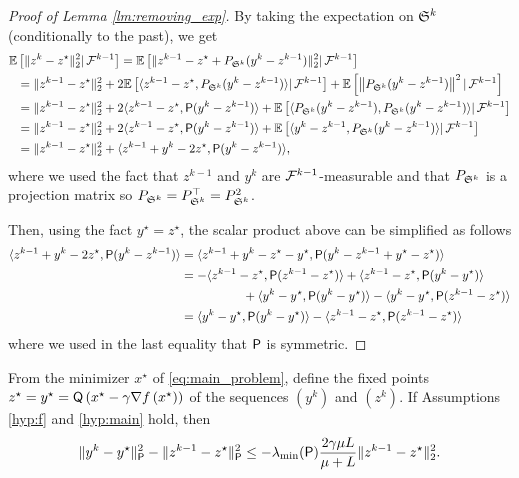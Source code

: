 \begin{proof}[Proof of Lemma \ref{lm:removing_exp}]
By taking the expectation on $\mathfrak{S}^k$ (conditionally to the past), we get 
\begin{align*}
\mathbb{E}&\left[\|z^{k} - z^\star\|_2^2|\,\mathcal{F}^{k-1}\right]  = \mathbb{E} \left[\|z^{k-1} - z^\star + P_{\mathfrak{S}^k}(y^k-z^{k-1}) \|_2^2 |\,\mathcal{F}^{k-1}\right]\\
&= \|z^{k-1}-z^\star\|_2^2 + 2 \mathbb{E} \left[  \langle z^{k-1}-z^\star, P_{\mathfrak{S}^k}(y^k - z^{k-1} ) \rangle |\,\mathcal{F}^{k-1}\right]+ \mathbb{E} \left[ \left\| P_{\mathfrak{S}^k}(y^k-z^{k-1}) \right\|^2 |\,\mathcal{F}^{k-1}\right] \\
&=\|z^{k-1}-z^\star\|_2^2 + 2\langle z^{k-1}-z^\star, {\mathsf{P}}(y^k - z^{k-1} ) \rangle + \mathbb{E} \left[\langle  P_{\mathfrak{S}^k}(y^k-z^{k-1}), P_{\mathfrak{S}^k} (y^k-z^{k-1})\rangle |\,\mathcal{F}^{k-1}\right]\\
&=\|z^{k-1}-z^\star\|_2^2 + 2\langle z^{k-1}-z^\star, {\mathsf{P}}(y^k - z^{k-1} ) \rangle + \mathbb{E} \left[ \langle y^k-z^{k-1}, P_{\mathfrak{S}^k} (y^k-z^{k-1})\rangle |\,\mathcal{F}^{k-1}\right] \\
&= \|z^{k-1}-z^\star\|_2^2 + \langle z^{k-1} + y^k - 2 z^\star , {\mathsf{P}}(y^k - z^{k-1} ) \rangle,
\end{align*}
where we used the fact that $z^{k-1}$ and $y^k$ are $\mathcal{F}^{k-1}$-measurable and that $P_{\mathfrak{S}^k}$ is a projection matrix so $P_{\mathfrak{S}^k} = P_{\mathfrak{S}^k}^\top = P_{\mathfrak{S}^k}^2 $.

Then, using the fact $y^\star = z^\star$, the scalar product above can be simplified as follows
\begin{align*}
\nonumber\langle z^{k-1} + y^k - 2z^\star , {\mathsf{P}}(y^k - z^{k-1}) \rangle &= \langle z^{k-1} + y^k - z^\star - y^\star, {\mathsf{P}}(y^k - z^{k-1} + y^\star -  z^\star ) \rangle \\
 \nonumber
 &=  - \langle z^{k-1}  - z^\star, {\mathsf{P}}(z^{k-1} - z^\star) \rangle + \langle z^{k-1} - z^\star, {\mathsf{P}}(y^k - y^\star) \rangle\\
 \nonumber
&~~~~~~~~~~~~~~~ + \langle y^k  - y^\star, {\mathsf{P}}(y^k - y^\star) \rangle - \langle y^k - y^\star, {\mathsf{P}}(z^{k-1} - z^\star) \rangle\\
&=  \langle y^k  - y^\star, {\mathsf{P}}(y^k - y^\star) \rangle - \langle z^{k-1}  - z^\star, {\mathsf{P}}(z^{k-1} - z^\star) \rangle
\end{align*}
where we used in the last equality that ${\mathsf{P}}$ is symmetric.
\end{proof}



\begin{lemma}\label{lm:bub}
From the minimizer  $x^\star$  of \eqref{eq:main_problem}, define the fixed points $z^\star = y^\star = {\mathsf{Q}}\left(x^\star - \gamma\nabla f\left(x^\star\right)\right)$ of the sequences $(y^k)$ and $(z^k)$. 
If Assumptions \ref{hyp:f} and \ref{hyp:main} hold, then
    \begin{equation*}
\|y^{k}-y^\star\|_{{\mathsf{P}}}^2 -  \|z^{k-1}-z^\star\|_{{\mathsf{P}}}^2 \leq - \lambda_{\min}({\mathsf{P}}) \frac{2\gamma\mu L}{\mu + L}\|z^{k-1} - z^\star\|_2^2.
\end{equation*}
\end{lemma}


